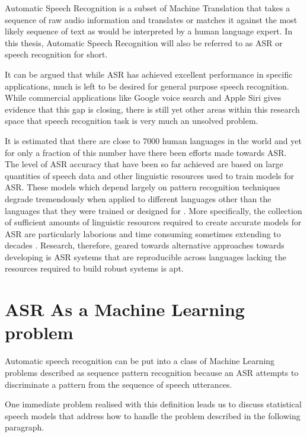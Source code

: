 Automatic Speech Recognition is a subset of Machine Translation that takes a sequence of raw audio information and translates or matches it against the most likely sequence of text as would be interpreted by a human language expert.  In this thesis, Automatic Speech Recognition will also be referred to as 
ASR or speech recognition for short.

It can be argued that while ASR has achieved excellent performance in specific applications, much is left to be desired for general purpose speech recognition. While commercial applications like Google voice search and Apple Siri gives evidence that this gap is closing, there is still yet other areas within this research space that speech recognition task is very much an unsolved problem.

It is estimated that there are close to 7000 human languages in the world \citep{besacier2014automatic} and yet for only a fraction of this number have there been efforts made towards ASR.  The level of ASR accuracy that have been so far achieved are based on large quantities of speech data and other linguistic resources used to train models for ASR. These models which depend largely on pattern recognition techniques degrade tremendously  when applied to different languages other than the languages that they were trained or designed for  \citep{Rosenberg2017end,besacier2014introduction}. More specifically, the collection of sufficient amounts of linguistic resources required to create accurate models for ASR are particularly laborious and time consuming sometimes extending to decades \citep{goldman2011easyalign,stan2016alisa}.  Research, therefore, geared towards alternative approaches towards developing is ASR systems that are reproducible across languages lacking the resources required to build robust systems is apt.

\section{ASR As a Machine Learning  problem}\label{ASRMLP}
\pagestyle{plain}
Automatic speech recognition can be put into a class of Machine Learning problems described as sequence pattern recognition because an ASR attempts to discriminate a pattern from the sequence of speech utterances. 

One immediate problem realised with this definition leads us to discuss statistical speech models that address how to handle the problem described in the following paragraph.

